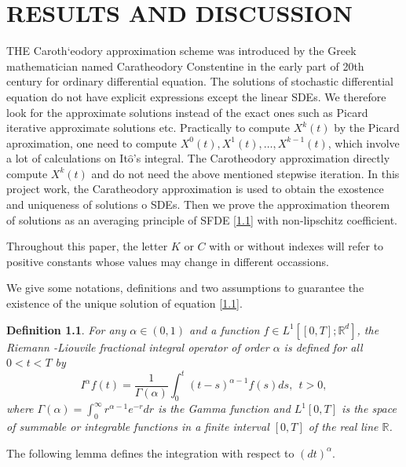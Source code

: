 \documentclass[a4 paper, 12pt]{report}
\theoremstyle{plain}
\newtheorem{definition}[theorem]{\textbf{Definition}}
\begin{document}
\chapter{RESULTS AND DISCUSSION}
\noindent
\par THE Caroth`eodory approximation scheme was introduced by the Greek mathematician named Caratheodory Constentine in the early part of 20th century for ordinary differential equation. The solutions of stochastic differential equation do not have explicit expressions except the linear SDEs. We therefore look for the approximate solutions instead of the exact ones such as Picard iterative approximate solutions etc. Practically to compute $X^k(t)$ by the Picard aproximation, one need to compute $X^0(t), X^{1}(t),\ldots,X^{k-1}(t)$, which involve a lot of calculations on It$\hat{\mbox{o}}$'s integral. The Carotheodory approximation directly compute $X^k(t)$ and do not need the above mentioned stepwise iteration. In this project work, the Caratheodory approximation is used to obtain the exostence and uniqueness of solutions o SDEs. Then we prove the approximation theorem of solutions as an averaging principle of SFDE \eqref{1.1} with non-lipschitz coefficient.\\
\par Throughout this paper, the letter $K$ or $C$ with or without indexes will refer to positive constants whose values may change in different occassions.\\
\par We give some notations, definitions and two assumptions to guarantee the existence of the unique solution of equation \eqref{1.1}. 


\begin{definition}\label{d2.1}
\normalfont
For any $\alpha\in(0,1)$ and a function $f\in L^1[[0,T];\mathbb{R}^d]$, the Riemann -Liouvile fractional integral operator of order $\alpha$ is defined for all $0<t<T$ by 
$$
I^\alpha f(t) = \frac{1}{\Gamma(\alpha)}\int_0^t(t-s)^{\alpha-1}f(s)ds,~~t>0,
$$
where $\Gamma(\alpha) = \int_0^\infty r^{\alpha-1}e^{-r}dr$ is the Gamma function and $L^1[0, T ]$ is the space of summable or integrable functions in a finite interval $[0,T]$ of the real line $\mathbb{R}$.
\end{definition}
The following lemma defines the integration with respect to $(dt)^\alpha$.
\end{document}
